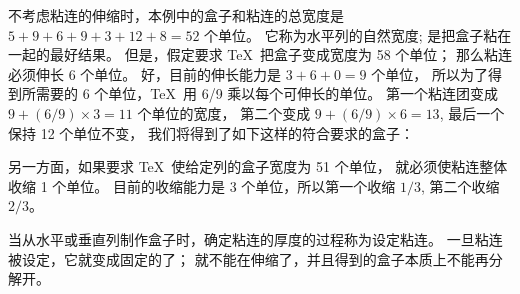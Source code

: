 不考虑粘连的伸缩时，本例中的盒子和粘连的总宽度是 $5+9+6+9+3+12+8=52$ 个单位。%
它称为水平列的{自然宽度};
是把盒子粘在一起的最好结果。%
但是，假定要求 \TeX\ 把盒子变成宽度为 58 个单位；
那么粘连必须伸长 6 个单位。%
好，目前的伸长能力是 $3+6+0=9$ 个单位，
所以为了得到所需要的 6 个单位，\TeX\ 用 6/9 乘以每个可伸长的单位。%
第一个粘连团变成 $9+(6/9)\times3=11$ 个单位的宽度，
第二个变成 $9+(6/9)\times6=13$, 最后一个保持 12 个单位不变，
我们将得到了如下这样的符合要求的盒子：
\begindisplay\eightpoint
\vbox{\kern-3pt
    \hbox{\samplebox{7mm}{8mm}{5\varunit}{}%
      \samplebox{3mm}{2mm}{6\varunit}{}%
      \samplebox{8mm}{3mm}{3\varunit}{}%
      \samplebox{4mm}{7mm}{8\varunit}{}}
    \kern6pt
    }
\enddisplay

另一方面，如果要求 \TeX\ 使给定列的盒子宽度为 51 个单位，
就必须使粘连整体收缩 1 个单位。%
目前的收缩能力是 3 个单位，所以第一个收缩 $1/3$, 第二个收缩 $2/3$。

\smallbreak
\1当从水平或垂直列制作盒子时，确定粘连的厚度的过程称为{设定粘连}。%
一旦粘连被设定，它就变成固定的了；
就不能在伸缩了，并且得到的盒子本质上不能再分解开。

